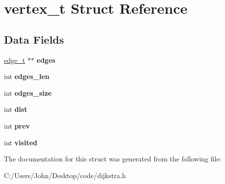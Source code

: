 \hypertarget{structvertex__t}{}\section{vertex\+\_\+t Struct Reference}
\label{structvertex__t}
\subsection*{Data Fields}
\begin{DoxyCompactItemize}
\item 
\mbox{\label{structvertex__t_a44ec839e92c78895bb8274234745a9ed}} 
\mbox{\hyperlink{structedge__t}{edge\+\_\+t}} $\ast$$\ast$ {\bfseries edges}
\item 
\mbox{\label{structvertex__t_abae40175c4cf7300e3318edf5b852d95}} 
int {\bfseries edges\+\_\+len}
\item 
\mbox{\label{structvertex__t_a45767113ce1b11455b6ada0fcec40f3d}} 
int {\bfseries edges\+\_\+size}
\item 
\mbox{\label{structvertex__t_a62d19f1b68cc51e55723b31a29cdef78}} 
int {\bfseries dist}
\item 
\mbox{\label{structvertex__t_a034b3633bcf9859f3fb6b7ab7a334f6e}} 
int {\bfseries prev}
\item 
\mbox{\label{structvertex__t_a4b66973fd0abdd396e7c9af5f52a9600}} 
int {\bfseries visited}
\end{DoxyCompactItemize}


The documentation for this struct was generated from the following file\+:\begin{DoxyCompactItemize}
\item 
C\+:/\+Users/\+John/\+Desktop/code/dijkstra.\+h\end{DoxyCompactItemize}
